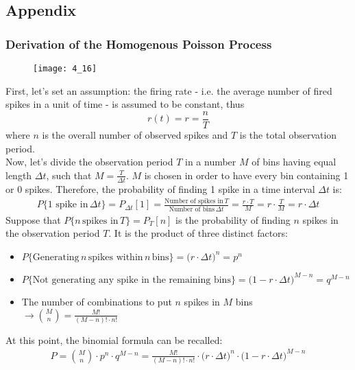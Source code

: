 \subsection{Appendix}
\subsubsection{Derivation of the Homogenous Poisson Process}
\begin{figure}[H]
    \texttt{[image: 4\_16]}
    \centering
\end{figure}
First, let's set an assumption: the firing rate - i.e. the average number
of fired spikes in a unit of time - is assumed to be constant, thus
\begin{equation*}
    r(t)=r=\frac{n}{T}
\end{equation*}
where \(n\) is the overall number of observed spikes
and \(T\) is the total observation period.\\
Now, let's divide the observation period \(T\) in a number \(M\) of bins having
equal length \(\Delta t\), such that \(M=\frac{T}{\Delta{t}}\). \(M\) is chosen in order to
have every bin containing 1 or 0 spikes. Therefore, the probability of finding 1 spike in a
time interval \(\Delta{t}\) is:
\begin{align*}
    P\{\text{1 spike in}\,\Delta{t}\}=P_{\Delta{t}}[1]
    =\frac{\text{Number of spikes in}\,T}{\text{Number of bins}\,\Delta{t}}
    =\frac{r\cdot{T}}{M}
    =r\cdot\frac{T}{M}
    =r\cdot{\Delta{t}}
\end{align*}
Suppose that \(P\{n\,\text{spikes in}\,T\}=P_T[n]\) is the probability of finding \(n\)
spikes in the observation period \(T\). It is the product of three distinct factors:
\begin{itemize}
    \item \(P\{\text{Generating}\,n\,\text{spikes within}\,n\,\text{bins}\}
          =\bigl(r\cdot{\Delta{t}}\bigr)^n=p^n\)
    \item \(P\{\text{Not generating any spike in the remaining bins}\}
          =\bigl(1-r\cdot{\Delta{t}}\bigr)^{M-n}=q^{M-n}\)
    \item The number of combinations to put \(n\) spikes in \(M\) bins
          \(\rightarrow\binom{M}{n}=\frac{M!}{(M-n)!\cdot{n!}}\)
\end{itemize}
At this point, the binomial formula can be recalled:
\begin{align*}
    P=\binom{M}{n}\cdot{p^n}\cdot{q^{M-n}}=\frac{M!}{(M-n)!\cdot{n!}}\cdot{\bigl(r\cdot{\Delta{t}}\bigr)^n}\cdot{\bigl(1-r\cdot{\Delta{t}}\bigr)^{M-n}}
\end{align*}
